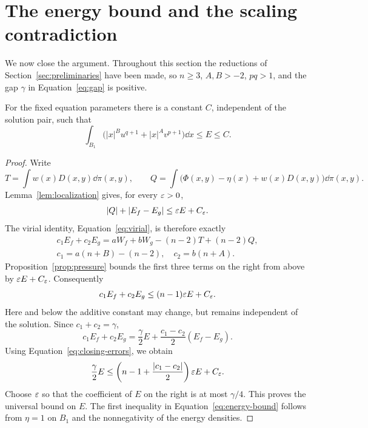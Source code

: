\section{The energy bound and the scaling contradiction}
\label{sec:conclusion}

We now close the argument. Throughout this section the reductions of
Section~\ref{sec:preliminaries} have been made, so
\(n\ge3\), \(A,B>-2\), \(pq>1\), and the gap
\(\gamma\) in Equation~\eqref{eq:gap} is positive.

\begin{proposition}\label{prop:energy}
For the fixed equation parameters there is a constant \(C\), independent
of the solution pair, such that
\begin{equation}\label{eq:energy-bound}
 \int_{B_1}\bigl(|x|^B u^{q+1}+|x|^A v^{p+1}\bigr)\dd x
 \le E\le C.
\end{equation}
\end{proposition}

\begin{proof}
Write
\[
 T=\int w(x)D(x,y)\dd\pi(x,y),\qquad
 Q=\int\bigl(\Phi(x,y)-\eta(x)+w(x)D(x,y)\bigr)\dd\pi(x,y).
\]
Lemma~\ref{lem:localization} gives, for every \(\varepsilon>0\),
\begin{equation}\label{eq:closing-errors}
 |Q|+|E_f-E_g|\le\varepsilon E+C_\varepsilon.
\end{equation}
The virial identity, Equation~\eqref{eq:virial}, is therefore exactly
\begin{equation}\label{eq:closing-identity}
\begin{gathered}
 c_1E_f+c_2E_g
   =aW_f+bW_g-(n-2)T+(n-2)Q,\\
 c_1=a(n+B)-(n-2),\quad c_2=b(n+A).
\end{gathered}
\end{equation}
Proposition~\ref{prop:pressure} bounds the first three terms on the
right from above by \(\varepsilon E+C_\varepsilon\). Consequently
\[
 c_1E_f+c_2E_g\le(n-1)\varepsilon E+C_\varepsilon.
\]
Here and below the additive constant may change, but remains independent
of the solution. Since \(c_1+c_2=\gamma\),
\[
 c_1E_f+c_2E_g
   =\frac{\gamma}{2}E+\frac{c_1-c_2}{2}(E_f-E_g).
\]
Using Equation~\eqref{eq:closing-errors}, we obtain
\[
 \frac{\gamma}{2}E
 \le\left(n-1+\frac{|c_1-c_2|}{2}\right)\varepsilon E+C_\varepsilon.
\]
Choose \(\varepsilon\) so that the coefficient of \(E\) on the right is at
most \(\gamma/4\). This proves the universal bound on \(E\).
The first inequality in Equation~\eqref{eq:energy-bound} follows from
\(\eta=1\) on \(B_1\) and the nonnegativity of the energy densities.
\end{proof}

